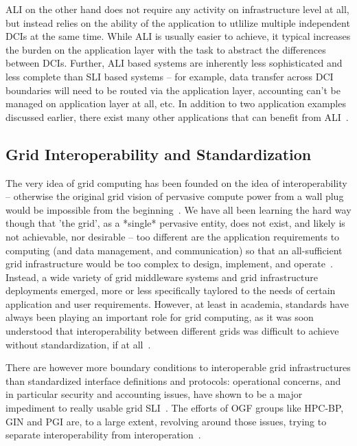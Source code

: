 \documentclass[10pt,conference,final,letterpaper,twoside,twocolumn,]{IEEEtran}
\begin{document}
 ALI on the other hand does not require any activity on infrastructure
 level at all, but instead relies on the ability of the application to
 utlilize multiple independent DCIs at the same time.  While ALI is
 usually easier to achieve, it typical increases the burden on the
 application layer with the task to abstract the differences between
 DCIs.  Further, ALI based systems are inherently less sophisticated
 and less complete than SLI based systems -- for example, data
 transfer across DCI boundaries will need to be routed via the
 application layer, accounting can't be managed on application layer
 at all, etc. In addition to two application examples discussed
 earlier, there exist many other applications that can benefit from
 ALI~\cite{fgcs-interop}.
 
 

 \subsection*{Grid Interoperability and Standardization}

 The very idea of grid computing has been founded on the idea of
 interoperability -- otherwise the original grid vision of pervasive
 compute power from a wall plug would be impossible from the
 beginning~\cite{blueprint}.  We have all been learning the hard way
 though that 'the grid', as a *single* pervasive entity, does not
 exist, and likely is not achievable, nor desirable -- too different
 are the application requirements to computing (and data management,
 and communication) so that an all-sufficient grid infrastructure
 would be too complex to design, implement, and
 operate~\cite{ogsa-use-cases}.  Instead, a wide variety of grid
 middleware systems and grid infrastructure deployments emerged, more
 or less specifically taylored to the needs of certain application and
 user requirements.  However, at least in academia, standards have
 always been playing an important role for grid computing, as it was
 soon understood that interoperability between different grids was
 difficult to achieve without standardization, if at all~\cite{...}.

 There are however more boundary conditions to interoperable grid
 infrastructures than standardized interface definitions and
 protocols: operational concerns, and in particular security and
 accounting issues, have shown to be a major impediment to really
 usable grid SLI~\cite{gin-usecases}.  The efforts of OGF groups like
 HPC-BP, GIN and PGI are, to a large extent, revolving around those
 issues, trying to separate interoperability from
 interoperation~\cite{gin-papers, ogf-www}.
\end{document}
